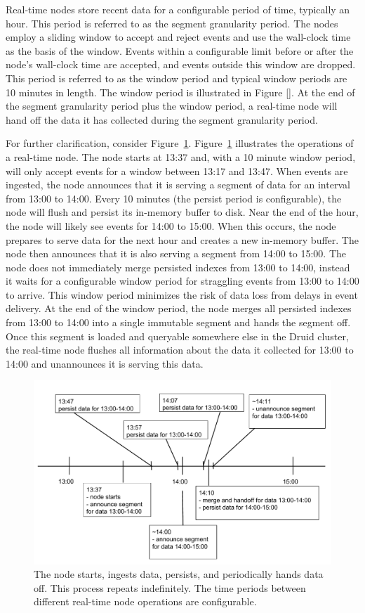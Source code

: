 \documentclass{vldb}
\begin{document}
Real-time nodes store recent data for a configurable period of time, typically
an hour. This period is referred to as the segment granularity period. The
nodes employ a sliding window to accept and reject events and use the
wall-clock time as the basis of the window. Events within a configurable limit
before or after the node’s wall-clock time are accepted, and events outside
this window are dropped. This period is referred to as the window period and
typical window periods are 10 minutes in length. The window period is
illustrated in Figure []. At the end of the segment granularity period plus the
window period, a real-time node will hand off the data it has collected during
the segment granularity period. 

For further clarification, consider Figure~\ref{fig:realtime_timeline}.
Figure~\ref{fig:realtime_timeline} illustrates the operations of a real-time
node. The node starts at 13:37 and, with a 10 minute window period, will only
accept events for a window between 13:17 and 13:47.  When events are ingested,
the node announces that it is serving a segment of data for an interval from
13:00 to 14:00. Every 10 minutes (the persist period is configurable), the node
will flush and persist its in-memory buffer to disk.  Near the end of the hour,
the node will likely see events for 14:00 to 15:00.  When this occurs, the node
prepares to serve data for the next hour and creates a new in-memory buffer.
The node then announces that it is also serving a segment from 14:00 to 15:00.
The node does not immediately merge persisted indexes from 13:00 to 14:00,
instead it waits for a configurable window period for straggling events from
13:00 to 14:00 to arrive. This window period minimizes the risk of data loss
from delays in event delivery. At the end of the window period, the node merges
all persisted indexes from 13:00 to 14:00 into a single immutable segment and
hands the segment off. Once this segment is loaded and queryable somewhere else
in the Druid cluster, the real-time node flushes all information about the data
it collected for 13:00 to 14:00 and unannounces it is serving this data.

\begin{figure}
\centering
\includegraphics[width = 4.5in]{realtime_timeline}
\caption{The node starts, ingests data, persists, and periodically hands data
off. This process repeats indefinitely. The time periods between different
real-time node operations are configurable.}
\label{fig:realtime_timeline}
\end{figure}
\end{document}
